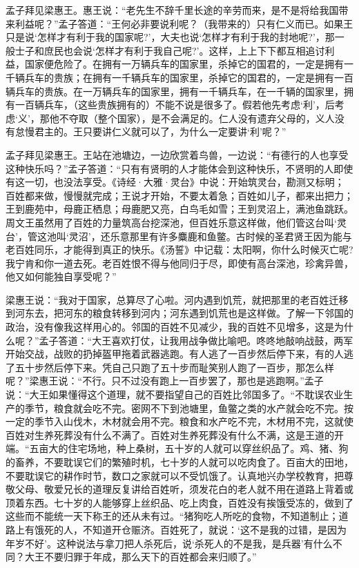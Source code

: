 \documentclass[12pt,UTF-8,openany,a4]{ctexbook}
\begin{document}
\begin{large}
    \yiwen 
    孟子拜见梁惠王。惠王说：“老先生不辞千里长途的辛劳而来，是不是将给我国带来利益呢？”孟子答道：“王何必非要说利呢？（我带来的）只有仁义而已。如果王只是说‘怎样才有利于我的国家呢?’，大夫也说‘怎样才有利于我的封地呢?’，那一般士子和庶民也会说‘怎样才有利于我自己呢?’。这样，上上下下都互相追讨利益，国家便危险了。在拥有一万辆兵车的国家里，杀掉它的国君的，一定是拥有一千辆兵车的贵族；在拥有一千辆兵车的国家里，杀掉它的国君的，一定是拥有一百辆兵车的贵族。在一万辆兵车的国家里，拥有一千辆兵车，在一千辆的国家里，拥有一百辆兵车，（这些贵族拥有的）不能不说是很多了。假若他先考虑‘利’，后考虑‘义’，那他不夺取（整个国家），是不会满足的。仁人没有遗弃父母的，义人没有怠慢君主的。王只要讲仁义就可以了，为什么一定要讲‘利’呢？”
    
    孟子拜见梁惠王。王站在池塘边，一边欣赏着鸟兽，一边说：“有德行的人也享受这种快乐吗？”孟子答道：“只有有贤明的人才能体会到这种快乐，不贤明的人即使有这一切，也没法享受。《诗经·大雅·灵台》中说：开始筑灵台，勘测又标明；百姓都来做，慢慢就完成；王说才开始，不要太着急；百姓如儿子，都来出把力；王到鹿苑中，母鹿正栖息；母鹿肥又亮，白鸟毛如雪；王到灵沼上，满池鱼跳跃。周文王虽然用了百姓的力量筑高台挖深池，但百姓乐意这样做，他们管这台叫‘灵台’，管这池叫‘灵沼’，还乐意那里有许多麋鹿和鱼鳖。古时候的圣君贤王因为能与老百姓同乐，才能得到真正的快乐。《汤誓》中记载：太阳啊，你什么时候灭亡呢?我宁肯和你一道去死。老百姓恨不得与他同归于尽，即使有高台深池，珍禽异兽，他又如何能独自享受呢？”
    
    梁惠王说：“我对于国家，总算尽了心啦。河内遇到饥荒，就把那里的老百姓迁移到河东去，把河东的粮食转移到河内；河东遇到饥荒也是这样做。了解一下邻国的政治，没有像我这样用心的。邻国的百姓不见减少，我的百姓不见增多，这是为什么呢？”孟子答道：“大王喜欢打仗，让我用战争做比喻吧。咚咚地敲响战鼓，两军开始交战，战败的扔掉盔甲拖着武器逃跑。有人逃了一百步然后停下来，有的人逃了五十步然后停下来。凭自己只跑了五十步而耻笑别人跑了一百步，那怎么样呢？”梁惠王说：“不行。只不过没有跑上一百步罢了，那也是逃跑啊。”孟子说：“大王如果懂得这个道理，就不要指望自己的百姓比邻国多了。“不耽误农业生产的季节，粮食就会吃不完。密网不下到池塘里，鱼鳖之类的水产就会吃不完。按一定的季节入山伐木，木材就会用不完。粮食和水产吃不完，木材用不完，这就使百姓对生养死葬没有什么不满了。百姓对生养死葬没有什么不满，这是王道的开端。“五亩大的住宅场地，种上桑树，五十岁的人就可以穿丝织品了。鸡、猪、狗的畜养，不要耽误它们的繁殖时机，七十岁的人就可以吃肉食了。百亩大的田地，不要耽误它的耕作时节，数口之家就可以不受饥饿了。认真地兴办学校教育，把尊敬父母、敬爱兄长的道理反复讲给百姓听，须发花白的老人就不用在道路上背着或顶着东西。七十岁的人能够穿上丝织品、吃上肉食，百姓没有挨饿受冻的，做到了这些而不能统一天下称王的还从未有过。“猪狗吃人所吃的食物，不知道制止；道路上有饿死的人，不知道开仓赈济。百姓死了，就说：‘这不是我的过错，是因为年岁不好’。这种说法与拿刀把人杀死后，说‘杀死人的不是我，是兵器’有什么不同？大王不要归罪于年成，那么天下的百姓都会来归顺了。”
    

\end{large}
\end{document}
